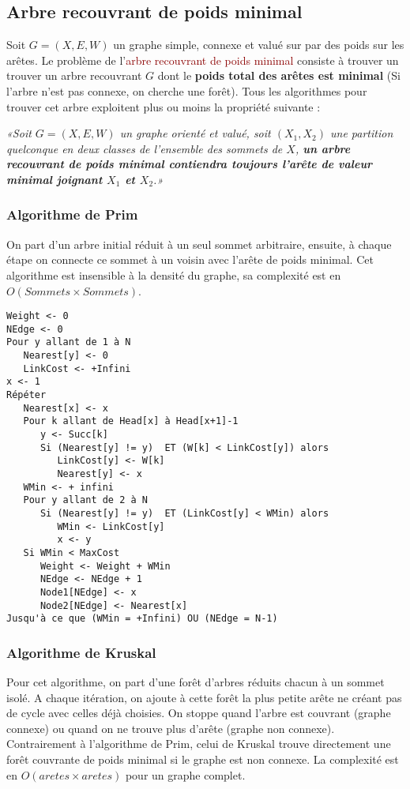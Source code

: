 \documentclass{article}
\newcommand{\red}[1]{\textcolor{darkred}{#1}}
\begin{document}
\subsection{Arbre recouvrant de poids minimal}

Soit $G=(X,E,W)$ un graphe simple, connexe et valué sur par des poids sur les arêtes. Le problème de l'\red{arbre recouvrant de poids minimal} consiste à trouver un trouver un 
arbre recouvrant $G$ dont le \textbf{poids total des arêtes est minimal} (Si l'arbre n'est pas connexe, on cherche une forêt). Tous les algorithmes pour trouver cet arbre 
exploitent plus ou moins la propriété suivante : 
\begin{center}\textit{«Soit $G=(X,E,W)$ un graphe orienté et valué, soit $(X_1,X_2)$ une partition quelconque en deux classes de l'ensemble des 
sommets de $X$, \textbf{un arbre recouvrant de poids minimal contiendra toujours l'arête de valeur minimal joignant $X_1$ et $X_2$}.»}\end{center}

\subsubsection{Algorithme de Prim}

On part d'un arbre initial réduit à un seul sommet arbitraire, ensuite, à chaque étape on connecte ce sommet à un voisin avec l'arête de poids minimal. Cet algorithme est insensible 
à la densité du graphe, sa complexité est en $O(Sommets \times Sommets)$.
\begin{verbatim}
Weight <- 0
NEdge <- 0
Pour y allant de 1 à N
   Nearest[y] <- 0
   LinkCost <- +Infini
x <- 1
Répéter
   Nearest[x] <- x
   Pour k allant de Head[x] à Head[x+1]-1
      y <- Succ[k]
      Si (Nearest[y] != y)  ET (W[k] < LinkCost[y]) alors
         LinkCost[y] <- W[k]
         Nearest[y] <- x
   WMin <- + infini
   Pour y allant de 2 à N
      Si (Nearest[y] != y)  ET (LinkCost[y] < WMin) alors
         WMin <- LinkCost[y]
         x <- y
   Si WMin < MaxCost
      Weight <- Weight + WMin
      NEdge <- NEdge + 1
      Node1[NEdge] <- x
      Node2[NEdge] <- Nearest[x]
Jusqu'à ce que (WMin = +Infini) OU (NEdge = N-1)
\end{verbatim}

\subsubsection{Algorithme de Kruskal}

Pour cet algorithme, on part d’une forêt d’arbres réduits chacun à un sommet isolé. A chaque itération, on ajoute à cette forêt la plus petite arête ne créant pas de cycle avec celles 
déjà choisies. On stoppe quand l’arbre est couvrant (graphe connexe) ou quand on ne trouve plus d’arête (graphe non connexe). Contrairement à l’algorithme de Prim, celui de Kruskal 
trouve directement une forêt couvrante de poids minimal si le graphe est non connexe. La complexité est en $O(aretes \times aretes)$ pour un graphe complet.
\end{document}
